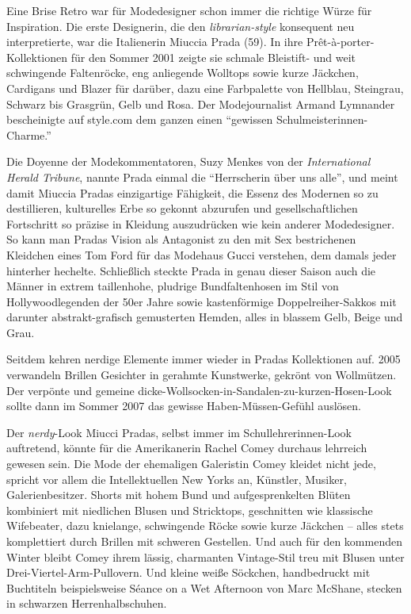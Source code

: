 \documentclass[output=paper]{langscibook}
\begin{document}
Eine Brise Retro war für Modedesigner schon immer die richtige Würze für
Inspiration. Die erste Designerin, die den \emph{librarian-style}
konsequent neu interpretierte, war die Italienerin Miuccia Prada (59).
In ihre Prêt-à-porter-Kollektionen für den Sommer 2001 zeigte sie
schmale Bleistift- und weit schwingende Faltenröcke, eng anliegende
Wolltops sowie kurze Jäckchen, Cardigans und Blazer für darüber, dazu
eine Farbpalette von Hellblau, Steingrau, Schwarz bis Grasgrün, Gelb und
Rosa. Der Modejournalist Armand Lymnander bescheinigte auf style.com dem
ganzen einen ``gewissen Schulmeisterinnen-Charme.''

Die Doyenne der Modekommentatoren, Suzy Menkes von der
\emph{International Herald Tribune}, nannte Prada einmal die
``Herrscherin über uns alle'', und meint damit Miuccia Pradas
einzigartige Fähigkeit, die Essenz des Modernen so zu destillieren,
kulturelles Erbe so gekonnt abzurufen und gesellschaftlichen Fortschritt
so präzise in Kleidung auszudrücken wie kein anderer Modedesigner. So
kann man Pradas Vision als Antagonist zu den mit Sex bestrichenen
Kleidchen eines Tom Ford für das Modehaus Gucci verstehen, dem damals
jeder hinterher hechelte. Schließlich steckte Prada in genau dieser
Saison auch die Männer in extrem taillenhohe, pludrige Bundfaltenhosen
im Stil von Hollywoodlegenden der 50er Jahre sowie kastenförmige
Doppelreiher-Sakkos mit darunter abstrakt-grafisch gemusterten Hemden,
alles in blassem Gelb, Beige und Grau.

Seitdem kehren nerdige Elemente immer wieder in Pradas Kollektionen auf.
2005 verwandeln Brillen Gesichter in gerahmte Kunstwerke, gekrönt von
Wollmützen. Der verpönte und gemeine
dicke-Wollsocken-in-Sandalen-zu-kurzen-Hosen-Look sollte dann im Sommer
2007 das gewisse Haben-Müssen-Gefühl auslösen.

Der \emph{nerdy}-Look Miucci Pradas, selbst immer im
Schullehrerinnen-Look auftretend, könnte für die Amerikanerin Rachel
Comey durchaus lehrreich gewesen sein. Die Mode der ehemaligen
Galeristin Comey kleidet nicht jede, spricht vor allem die
Intellektuellen New Yorks an, Künstler, Musiker, Galerienbesitzer.
Shorts mit hohem Bund und aufgesprenkelten Blüten kombiniert mit
niedlichen Blusen und Stricktops, geschnitten wie klassische Wifebeater,
dazu knielange, schwingende Röcke sowie kurze Jäckchen -- alles stets
komplettiert durch Brillen mit schweren Gestellen. Und auch für den
kommenden Winter bleibt Comey ihrem lässig, charmanten Vintage-Stil treu
mit Blusen unter Drei-Viertel-Arm-Pullovern. Und kleine weiße Söckchen,
handbedruckt mit Buchtiteln beispielsweise Séance on a Wet Afternoon von
Marc McShane, stecken in schwarzen Herrenhalbschuhen.
\end{document}
